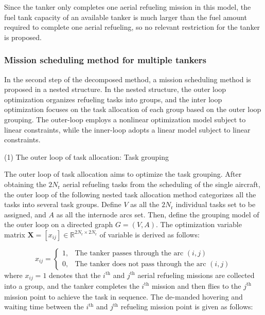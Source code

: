 Since the tanker only completes one aerial refueling mission in this model, the fuel tank capacity of an available tanker is much larger than the fuel amount required to complete one aerial refueling, so no relevant restriction for the tanker is proposed.




\subsubsection{Mission scheduling method for multiple tankers}

In the second step of the decomposed method, a mission scheduling method is proposed in a nested structure. In the nested structure, the outer loop optimization organizes refueling tasks into groups, and the inter loop optimization focuses on the task allocation of each group based on the outer loop grouping. The outer-loop employs a nonlinear optimization model subject to linear constraints, while the inner-loop adopts a linear model subject to linear constraints.

(1) The outer loop of task allocation: Task grouping 

The outer loop of task allocation aims to optimize the task grouping. After obtaining the $2N_{\text{r}}$  aerial refueling tasks from the scheduling of the single aircraft, the outer loop of the following nested task allocation method categorizes all the tasks into several task groups. Define $V$ as all the $2N_{\text{r}}$  individual tasks set to be assigned, and $A$ as all the internode arcs set. Then, define the grouping model of the outer loop on a directed graph $G=(V,A)$. The optimization variable matrix $\mathbf{X}=\left[x_{ij}\right]\in\mathbb{R}^{2N_{\text{r}}\times2N_{\text{r}}}$  of variable is derived as follows:

\begin{equation}
x_{ij}=\begin{cases}1,&\text{The tanker passes through the arc }\left(i,j\right)\\0,&\text{The tanker does not pass through the arc }\left(i,j\right)\end{cases}
\label{eq:15.38}
\end{equation}
where  $x_{ij}=1$ denotes that the $i_{}^{\text{th}}$ and $j_{}^{\text{th}}$  aerial refueling missions are collected into a group, and the tanker completes the $i_{}^{\text{th}}$  mission and then flies to the $j_{}^{\text{th}}$  mission point to achieve the task in sequence. The de-manded hovering and waiting time between the $i_{}^{\text{th}}$  and $j_{}^{\text{th}}$  refueling mission point is given as follows:

